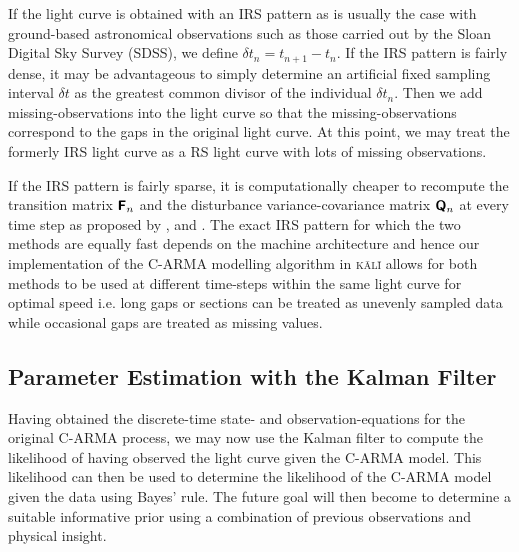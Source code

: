 \documentclass[a4paper,fleqn,usenatbib]{mnras}
\begin{document}
If the light curve is obtained with an IRS pattern as is usually the case with ground-based astronomical observations such as those carried out by the Sloan Digital Sky Survey (SDSS), we define $\delta t_{n} = t_{n+1} - t_{n}$. If the IRS pattern is fairly dense, it may be advantageous to simply determine an artificial fixed sampling interval $\delta t$ as the greatest common divisor of the individual $\delta t_{n}$. Then we add missing-observations into the light curve so that the missing-observations correspond to the gaps in the original light curve. At this point, we may treat the formerly IRS light curve as a RS light curve with lots of missing observations.

If the IRS pattern is fairly sparse, it is computationally cheaper to recompute the transition matrix $\textbf{\textsf{F}}_{n}$ and the disturbance variance-covariance matrix $\textbf{\textsf{Q}}_{n}$ at every time step as proposed by \cite{JonesAckerson90}, \cite{Jones} and \cite{Kelly14}. The exact IRS pattern for which the two methods are equally fast depends on the machine architecture and hence our implementation of the C-ARMA modelling algorithm in \textsc{k\={a}l\={i}} allows for both methods to be used at different time-steps within the same light curve for optimal speed i.e. long gaps or sections can be treated as unevenly sampled data while occasional gaps are treated as missing values.

\subsection[Parameter Estimation]{Parameter Estimation with the Kalman Filter}\label{sec:Kalman}

Having obtained the discrete-time state- and observation-equations for the original C-ARMA process, we may now use the Kalman filter to compute the likelihood of having observed the light curve given the C-ARMA model. This likelihood can then be used to determine the likelihood of the C-ARMA model given the data using Bayes' rule. The future goal will then become to determine a suitable informative prior using a combination of previous observations and physical insight.
\end{document}
